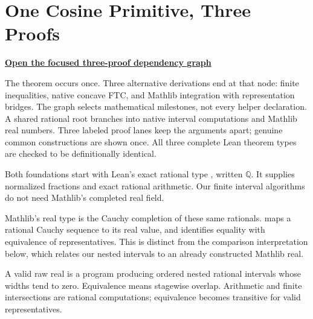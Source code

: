 \chapter{One Cosine Primitive, Three Proofs}\label{ch:three-cosine-proofs}

\begin{center}
\href{cosine-primitive-graph.html}{\textbf{Open the focused three-proof dependency graph}}
\end{center}

The theorem occurs once. Three alternative derivations end at that node:
finite inequalities, native concave FTC, and Mathlib integration with
representation bridges. The graph selects mathematical milestones, not every
helper declaration. A shared rational root branches into native interval
computations and Mathlib real numbers. Three labeled proof lanes keep the
arguments apart; genuine common constructions are shown once. All three
complete Lean theorem types are checked to be definitionally identical.

\begin{definition}\label{def:c3-rationals}
\leanok
Both foundations start with Lean's exact rational type , written
$\mathbb{Q}$. It supplies normalized fractions and exact rational arithmetic.
Our finite interval algorithms do not need Mathlib's completed real field.
\end{definition}

\begin{definition}\label{def:c3-mreal}
\mathlibok
Mathlib's real type is the Cauchy completion of these same rationals.
 maps a rational Cauchy sequence to its real value, and
 identifies equality with equivalence of representatives.
This is distinct from the comparison interpretation below, which relates
our nested intervals to an already constructed Mathlib real.
\end{definition}

\begin{definition}\label{def:c3-intervals}
\leanok
A valid raw real is a program producing ordered nested rational intervals
whose widths tend to zero. Equivalence means stagewise overlap. Arithmetic
and finite intersections are rational computations; equivalence becomes
transitive for valid representatives.
\end{definition}


